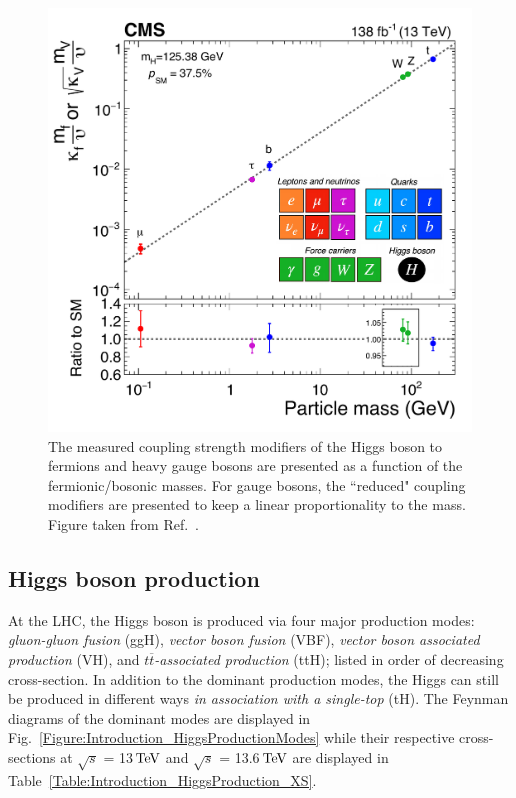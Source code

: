 \begin{figure}[h]
\centering
\includegraphics[width= .7\textwidth]{Figures/Introduction/CMS_Higgs_FermionCouplings.pdf}
\caption[Measured Higgs coupling modifiers versus fermion and boson masses]{The measured coupling strength modifiers of the Higgs boson to fermions and heavy gauge bosons are presented as a function of the fermionic/bosonic masses. For gauge bosons, the ``reduced" coupling modifiers are presented to keep a linear proportionality to the mass. Figure taken from Ref.~\cite{CMS_Couplings_Measurement}.}
\label{Figure:Introduction_CMScouplings}
\end{figure}

\subsection{Higgs boson production}

At the LHC, the Higgs boson is produced via four major production modes: \textit{gluon-gluon fusion} (ggH), \textit{vector boson fusion} (VBF), \textit{vector boson associated production} (VH), and \textit{$t\overline{t}$-associated production} (ttH); listed in order of decreasing cross-section. In addition to the dominant production modes, the Higgs can still be produced in different ways \eg \textit{in association with a single-top} (tH). The Feynman diagrams of the dominant modes are displayed in Fig.~\ref{Figure:Introduction_HiggsProductionModes} while their respective cross-sections at $\sqrt{s}$ = 13$\,\text{Te\hspace{-.08em}V}$ and $\sqrt{s}$ = 13.6$\,\text{Te\hspace{-.08em}V}$ are displayed in Table~\ref{Table:Introduction_HiggsProduction_XS}. 


